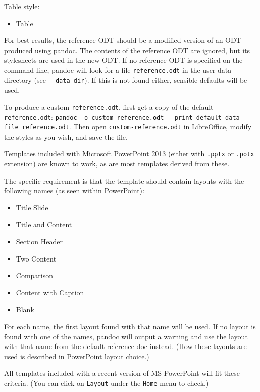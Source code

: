 \documentclass[
]{article}
\providecommand{\tightlist}{%
  \setlength{\itemsep}{0pt}\setlength{\parskip}{0pt}}
\begin{document}
\begin{description}
\begin{description}
Table style:

\begin{itemize}
\tightlist
\item
  Table
\end{itemize}
\item[ODT]
For best results, the reference ODT should be a modified version of an
ODT produced using pandoc. The contents of the reference ODT are
ignored, but its stylesheets are used in the new ODT. If no reference
ODT is specified on the command line, pandoc will look for a file
\texttt{reference.odt} in the user data directory (see
\texttt{-\/-data-dir}). If this is not found either, sensible defaults
will be used.

To produce a custom \texttt{reference.odt}, first get a copy of the
default \texttt{reference.odt}:
\texttt{pandoc\ -o\ custom-reference.odt\ -\/-print-default-data-file\ reference.odt}.
Then open \texttt{custom-reference.odt} in LibreOffice, modify the
styles as you wish, and save the file.
\item[PowerPoint]
Templates included with Microsoft PowerPoint 2013 (either with
\texttt{.pptx} or \texttt{.potx} extension) are known to work, as are
most templates derived from these.

The specific requirement is that the template should contain layouts
with the following names (as seen within PowerPoint):

\begin{itemize}
\tightlist
\item
  Title Slide
\item
  Title and Content
\item
  Section Header
\item
  Two Content
\item
  Comparison
\item
  Content with Caption
\item
  Blank
\end{itemize}

For each name, the first layout found with that name will be used. If no
layout is found with one of the names, pandoc will output a warning and
use the layout with that name from the default reference doc instead.
(How these layouts are used is described in
\protect\hyperlink{powerpoint-layout-choice}{PowerPoint layout choice}.)

All templates included with a recent version of MS PowerPoint will fit
these criteria. (You can click on \texttt{Layout} under the
\texttt{Home} menu to check.)


\end{description}
\end{description}
\end{document}
